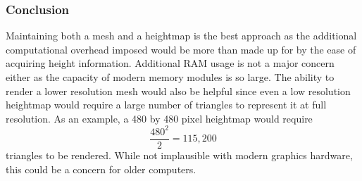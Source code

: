 \subsubsection{Conclusion}
Maintaining both a mesh and a heightmap is the best approach as the additional computational overhead imposed would be more than made up for by the ease of acquiring height information. Additional RAM usage is not a major concern either as the capacity of modern memory modules is so large. The ability to render a lower resolution mesh would also be helpful since even a low resolution heightmap would require a large number of triangles to represent it at full resolution. As an example, a 480 by 480 pixel heightmap would require \[ \frac{480^2}{2}=115,200 \] triangles to be rendered. While not implausible with modern graphics hardware, this could be a concern for older computers.
